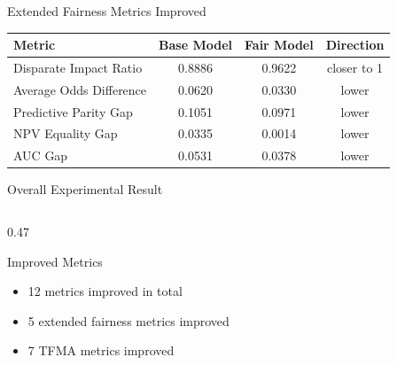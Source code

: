 \documentclass[10pt,aspectratio=169]{beamer}
\begin{document}
\begin{frame}{Extended Fairness Metrics Improved}
  \begin{table}
    \small
    \begin{tabular}{lccc}
      \toprule
      Metric & Base Model & Fair Model & Direction \\
      \midrule
      Disparate Impact Ratio & 0.8886 & 0.9622 & closer to 1 \\
      Average Odds Difference & 0.0620 & 0.0330 & lower \\
      Predictive Parity Gap & 0.1051 & 0.0971 & lower \\
      NPV Equality Gap & 0.0335 & 0.0014 & lower \\
      AUC Gap & 0.0531 & 0.0378 & lower \\
      \bottomrule
    \end{tabular}
  \end{table}

  \vspace{0.8em}
  \begin{center}
  \end{center}
\end{frame}


\begin{frame}{Overall Experimental Result}
  \begin{columns}[T,onlytextwidth]
    \begin{column}{0.47\textwidth}
      \begin{block}{Improved Metrics}
        \begin{itemize}
          \item 12 metrics improved in total
          \item 5 extended fairness metrics improved
          \item 7 TFMA metrics improved
        \end{itemize}
      \end{block}
    \end{column}
    
  \end{columns}

  \vspace{0.8em}
  \begin{center}
  \end{center}
\end{frame}
\end{document}

